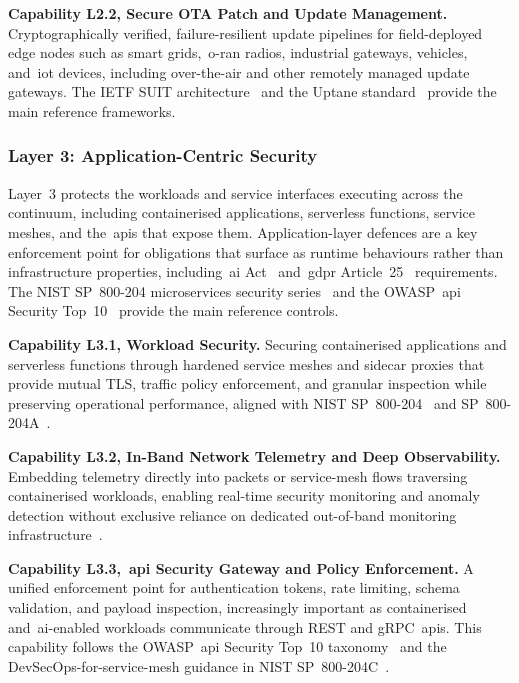 \documentclass{ieeeaccess}
\begin{document}
\textbf{Capability L2.2, Secure OTA Patch and Update Management.} Cryptographically verified, failure-resilient update pipelines for field-deployed edge nodes such as smart grids,~\gls{o-ran} radios, industrial gateways, vehicles, and~\gls{iot} devices, including over-the-air and other remotely managed update gateways. The IETF SUIT architecture~\cite{ietfrfc9019} and the Uptane standard~\cite{uptanestd} provide the main reference frameworks.

\subsubsection{Layer 3: Application-Centric Security}
\label{sec:L3}

Layer~3 protects the workloads and service interfaces executing across the continuum, including containerised applications, serverless functions, service meshes, and the~\glspl{api} that expose them. Application-layer defences are a key enforcement point for obligations that surface as runtime behaviours rather than infrastructure properties, including~\gls{ai} Act~\cite{euaiact} and~\gls{gdpr} Article~25~\cite{eugdpr} requirements. The NIST SP~800-204 microservices security series~\cite{chandramouli2019,chandramouli2020,chandramouli2022devsecops} and the OWASP~\gls{api} Security Top~10~\cite{owaspapi} provide the main reference controls.

\textbf{Capability L3.1, Workload Security.} Securing containerised applications and serverless functions through hardened service meshes and sidecar proxies that provide mutual TLS, traffic policy enforcement, and granular inspection while preserving operational performance, aligned with NIST SP~800-204~\cite{chandramouli2019} and SP~800-204A~\cite{chandramouli2020}.

\textbf{Capability L3.2, In-Band Network Telemetry and Deep Observability.} Embedding telemetry directly into packets or service-mesh flows traversing containerised workloads, enabling real-time security monitoring and anomaly detection without exclusive reliance on dedicated out-of-band monitoring infrastructure~\cite{chandramouli2019,chandramouli2020}.

\textbf{Capability L3.3,~\gls{api} Security Gateway and Policy Enforcement.} A unified enforcement point for authentication tokens, rate limiting, schema validation, and payload inspection, increasingly important as containerised and~\gls{ai}-enabled workloads communicate through REST and gRPC~\glspl{api}. This capability follows the OWASP~\gls{api} Security Top~10 taxonomy~\cite{owaspapi} and the DevSecOps-for-service-mesh guidance in NIST SP~800-204C~\cite{chandramouli2022devsecops}.
\end{document}
